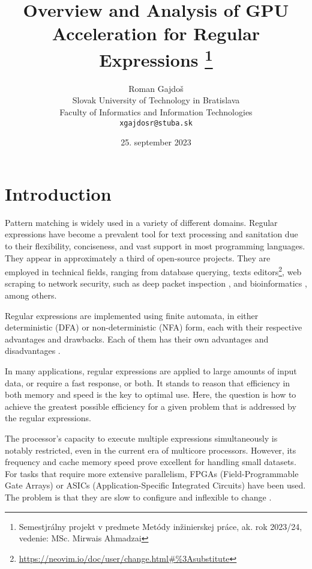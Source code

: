 \documentclass[10pt,onecolumn,twoside,english,a4paper]{article}
\title{Overview and Analysis of GPU Acceleration for Regular Expressions
\thanks{Semestjrálny projekt v predmete Metódy inžinierskej práce, ak. rok 2023/24, vedenie: MSc. Mirwais Ahmadzai}} %
\author{Roman Gajdoš\\[2pt]
	{\small Slovak University of Technology in Bratislava}\\
	{\small Faculty of Informatics and Information Technologies}\\
	{\small \texttt{xgajdosr@stuba.sk}}
	}
\date{\small 25. september 2023} %
\begin{document}
\maketitle

\begin{abstract}
	\blindtext[2]

\end{abstract}

\section{Introduction} \label{Introduction}
Pattern matching is widely used in a variety of different domains. Regular expressions have become a prevalent tool for text processing and sanitation due to their flexibility, conciseness, and vast support in most programming languages\cite{Chapman:Usage}. They appear in approximately a third of open-source projects\cite{Davis:Re-use}. They are employed in technical fields, ranging from database querying\cite{István:databases-regex}, texts editors\footnote{\url{https://neovim.io/doc/user/change.html\#\%3Asubstitute}}, web scraping \cite{Gunawan2019/03} to network security, such as deep packet inspection \cite{becchi2008workload}, and bioinformatics \cite{huang2008gpu}, among others.

Regular expressions are implemented using finite automata, in either deterministic (DFA) or non-deterministic (NFA) form, each with their respective advantages and drawbacks. Each of them has their own advantages and disadvantages \cite{Becchi:regex_large_dataset,Nourian:DemystifyingFSA,Zu:GPU-NFA}.

In many applications, regular expressions are applied to large amounts of input data, or require a fast response, or both. It stands to reason that efficiency in both memory and speed is the key to optimal use\cite{Xia:FSA-scaling}.
Here, the question is how to achieve the greatest possible efficiency for a given problem that is addressed by the regular expressions.

The processor's capacity to execute multiple expressions simultaneously is notably restricted, even in the current era of multicore processors\cite{Lee:myths}. However, its frequency and cache memory speed prove excellent for handling small datasets. For tasks that require more extensive parallelism, FPGAs (Field-Programmable Gate Arrays) or ASICs (Application-Specific Integrated Circuits) have been used. The problem is that they are slow to configure\cite{XU:regex_alg_slow} and inflexible to change \cite{fuchs2019accelerator,Liu:Asynchronous}.
\end{document}
